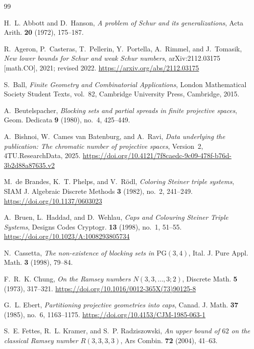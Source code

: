 \documentclass[11pt]{article}
\theoremstyle{plain}
\begin{document}
\begin{thebibliography}{99}

H.~L. Abbott and D.~Hanson,
\emph{A problem of Schur and its generalizations},
Acta Arith. \textbf{20} (1972), 175--187.

R.~Ageron, P.~Casteras, T.~Pellerin, Y.~Portella, A.~Rimmel, and J.~Tomasik,
\emph{New lower bounds for Schur and weak Schur numbers},
arXiv:2112.03175 [math.CO], 2021; revised 2022.
\url{https://arxiv.org/abs/2112.03175}

S.~Ball,
\emph{Finite Geometry and Combinatorial Applications},
London Mathematical Society Student Texts, vol.~82,
Cambridge University Press, Cambridge, 2015.

A.~Beutelspacher,
\emph{Blocking sets and partial spreads in finite projective spaces},
Geom. Dedicata \textbf{9} (1980), no.~4, 425--449.

A.~Bishnoi, W.~Cames van Batenburg, and A.~Ravi,
\emph{Data underlying the publication: The chromatic number of projective spaces},
Version~2, 4TU.ResearchData, 2025.
\url{https://doi.org/10.4121/7f8caedc-9c09-478f-b76d-3b2d88a87635.v2}

M.~de Brandes, K.~T. Phelps, and V.~R\"odl,
\emph{Coloring Steiner triple systems},
SIAM J. Algebraic Discrete Methods \textbf{3} (1982), no.~2, 241--249.
\url{https://doi.org/10.1137/0603023}

A.~Bruen, L.~Haddad, and D.~Wehlau,
\emph{Caps and Colouring Steiner Triple Systems},
Designs Codes Cryptogr. \textbf{13} (1998), no.~1, 51--55.
\url{https://doi.org/10.1023/A:1008293805734}

N.~Cassetta,
\emph{The non-existence of blocking sets in $\mathrm{PG}(3,4)$},
Ital. J. Pure Appl. Math. \textbf{3} (1998), 79--84.

F.~R.~K. Chung,
\emph{On the Ramsey numbers $N(3,3,\ldots,3;2)$},
Discrete Math. \textbf{5} (1973), 317--321.
\url{https://doi.org/10.1016/0012-365X(73)90125-8}

G.~L. Ebert,
\emph{Partitioning projective geometries into caps},
Canad. J. Math. \textbf{37} (1985), no.~6, 1163--1175.
\url{https://doi.org/10.4153/CJM-1985-063-1}

S.~E. Fettes, R.~L. Kramer, and S.~P. Radziszowski,
\emph{An upper bound of $62$ on the classical Ramsey number $R(3,3,3,3)$},
Ars Combin. \textbf{72} (2004), 41--63.


\end{thebibliography}
\end{document}
